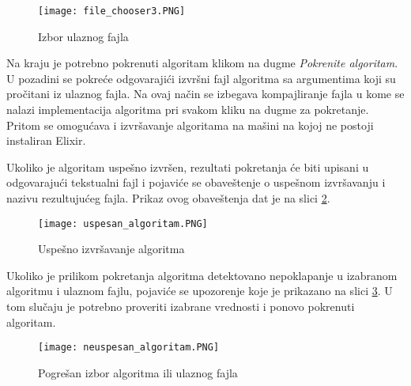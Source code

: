 \documentclass[12pt,oneside]{memoir}
\begin{document}
\begin{figure}[h]
\centering
\texttt{[image: file\_chooser3.PNG]}
\caption{Izbor ulaznog fajla}
\label{fig:fileChooser}
\end{figure}

Na kraju je potrebno pokrenuti algoritam klikom na dugme \textit{Pokrenite algoritam}. U pozadini se pokreće odgovarajići izvršni fajl algoritma sa argumentima koji su pročitani iz ulaznog fajla. Na ovaj način se izbegava kompajliranje fajla u kome se nalazi implementacija algoritma pri svakom kliku na dugme za pokretanje. Pritom se omogućava i izvršavanje algoritama na mašini na kojoj ne postoji instaliran Elixir.

Ukoliko je algoritam uspešno izvršen, rezultati pokretanja će biti upisani u odgovarajući tekstualni fajl i pojaviće se obaveštenje o uspešnom izvršavanju i nazivu rezultujućeg fajla. Prikaz ovog obaveštenja dat je na slici \ref{fig:uspesnoIzvrsavanje}.




\begin{figure}[h]
\centering
\texttt{[image: uspesan\_algoritam.PNG]}
\caption{Uspešno izvršavanje algoritma}
\label{fig:uspesnoIzvrsavanje}
\end{figure}

Ukoliko je prilikom pokretanja algoritma detektovano nepoklapanje u izabranom algoritmu i ulaznom fajlu, pojaviće se upozorenje koje je prikazano na slici \ref{fig:neuspesnoIzvrsavanje}. U tom slučaju je potrebno proveriti izabrane vrednosti i ponovo pokrenuti algoritam.

\newpage

\begin{figure}[h]
\centering
\texttt{[image: neuspesan\_algoritam.PNG]}
\caption{Pogrešan izbor algoritma ili ulaznog fajla}
\label{fig:neuspesnoIzvrsavanje}
\end{figure}
\end{document}
